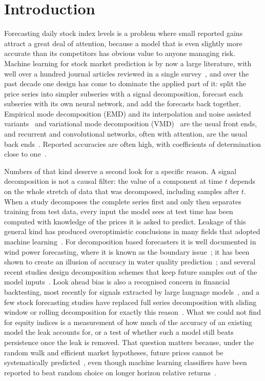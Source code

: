 \documentclass[pdflatex,sn-mathphys-num]{sn-jnl}%
\theoremstyle{thmstyleone}%
\theoremstyle{thmstyletwo}%
\theoremstyle{thmstylethree}%
\begin{document}
\section{Introduction}\label{sec:intro}

Forecasting daily stock index levels is a problem where small reported gains
attract a great deal of attention, because a model that is even slightly more
accurate than its competitors has obvious value to anyone managing risk.
Machine learning for stock market prediction is by now a large literature, with
well over a hundred journal articles reviewed in a single survey~\cite{kumbure2022},
and over the past decade one design has come to dominate the applied part of
it: split the price series into simpler subseries with a signal decomposition,
forecast each subseries with its own neural network, and add the forecasts back
together. Empirical mode decomposition (EMD) and its interpolation and noise
assisted variants~\cite{akimaemd2023,gruceemdan2023,ceemdanstock2025} and
variational mode decomposition (VMD)~\cite{jiang2025,wangwang2026} are the usual
front ends, and recurrent and convolutional networks, often with attention, are
the usual back ends~\cite{gong2024,zhao2025,ning2025}. Reported accuracies are
often high, with coefficients of determination close to
one~\cite{ning2025,jiang2025}.

Numbers of that kind deserve a second look for a specific reason. A signal
decomposition is not a causal filter: the value of a component at time $t$
depends on the whole stretch of data that was decomposed, including samples
after $t$. When a study decomposes the complete series first and only then
separates training from test data, every input the model sees at test time has
been computed with knowledge of the prices it is asked to predict. Leakage of
this general kind has produced overoptimistic conclusions in many fields that
adopted machine learning~\cite{kapoor2023}. For decomposition based
forecasters it is well documented in wind power forecasting, where it is known
as the boundary issue~\cite{chen2022}; it has been shown to create an illusion
of accuracy in water quality prediction~\cite{emdleak2024}; and several recent
studies design decomposition schemes that keep future samples out of the model
inputs~\cite{wang2024,yao2025,pang2026}. Look ahead bias is also a recognised
concern in financial backtesting, most recently for signals extracted by large
language models~\cite{glasserman2024}, and a few stock forecasting studies have
replaced full series decomposition with sliding window or rolling decomposition
for exactly this reason~\cite{liu2022,liu2024,wen2024,zhang2025}. What we could not
find for equity indices is a measurement of how much of the accuracy of an
existing model the leak accounts for, or a test of whether such a model still
beats persistence once the leak is removed. That question matters because,
under the random walk and efficient market hypotheses, future prices cannot be
systematically predicted~\cite{pernagallo2025}, even though machine learning
classifiers have been reported to beat random choice on longer horizon relative
returns~\cite{finrel2024}.
\end{document}
